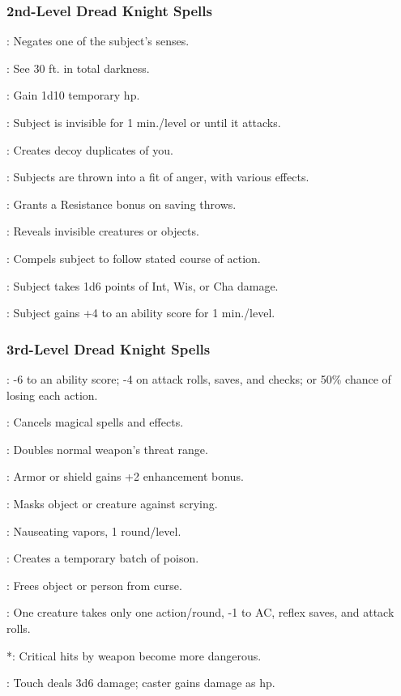\subsubsection{2nd-Level Dread Knight Spells}
\begin{list}{}{\leftmargin=1em}
\item {}: Negates one of the subject's senses.
\item {}: See 30 ft. in total darkness.
\item {}: Gain 1d10 temporary hp.
\item {}: Subject is invisible for 1 min./level or until it attacks.
\item {}: Creates decoy duplicates of you.
\item {}: Subjects are thrown into a fit of anger, with various effects.
\item {}: Grants a Resistance bonus on saving throws.
\item {}: Reveals invisible creatures or objects.
\item {}: Compels subject to follow stated course of action.
\item {}: Subject takes 1d6 points of Int, Wis, or Cha damage.
\item {}: Subject gains +4 to an ability score for 1 min./level.
\end{list}
\subsubsection{3rd-Level Dread Knight Spells}
\begin{list}{}{\leftmargin=1em}
\item {}: -6 to an ability score; -4 on attack rolls, saves, and checks; or 50\% chance of losing each action.
\item {}: Cancels magical spells and effects.
\item {}: Doubles normal weapon's threat range.
\item {}: Armor or shield gains +2 enhancement bonus.
\item {}: Masks object or creature against scrying.
\item {}: Nauseating vapors, 1 round/level.
\item {}: Creates a temporary batch of poison.
\item {}: Frees object or person from curse.
\item {}: One creature takes only one action/round, -1 to AC, reflex saves, and attack rolls.
\item {}*: Critical hits by weapon become more dangerous.
\item {}: Touch deals 3d6 damage; caster gains damage as hp.
\end{list}
